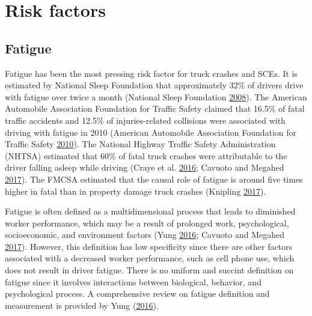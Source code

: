 \documentclass[12pt]{book}
\numberwithin{equation}{chapter}
\begin{document}
\hypertarget{risk-factors}{%
\section{Risk factors}\label{risk-factors}}

\hypertarget{fatigue}{%
\subsection{Fatigue}\label{fatigue}}

Fatigue has been the most pressing risk factor for truck crashes and SCEs. It is estimated by National Sleep Foundation that approximately 32\% of drivers drive with fatigue over twice a month (National Sleep Foundation \protect\hyperlink{ref-nsleepf}{2008}). The American Automobile Association Foundation for Traffic Safety claimed that 16.5\% of fatal traffic accidents and 12.5\% of injuries-related collisions were associated with driving with fatigue in 2010 (American Automobile Association Foundation for Traffic Safety \protect\hyperlink{ref-aaafoundation}{2010}). The National Highway Traffic Safety Administration (NHTSA) estimated that 60\% of fatal truck crashes were attributable to the driver falling asleep while driving (Craye et al. \protect\hyperlink{ref-craye2016multi}{2016}; Cavuoto and Megahed \protect\hyperlink{ref-cavuoto2017understanding}{2017}). The FMCSA estimated that the causal role of fatigue is around five times higher in fatal than in property damage truck crashes (Knipling \protect\hyperlink{ref-knipling2017threats}{2017}).

Fatigue is often defined as a multidimensional process that leads to diminished worker performance, which may be a result of prolonged work, psychological, socioeconomic, and environment factors (Yung \protect\hyperlink{ref-yung2016fatigue}{2016}; Cavuoto and Megahed \protect\hyperlink{ref-cavuoto2017understanding}{2017}). However, this definition has low specificity since there are other factors associated with a decreased worker performance, such as cell phone use, which does not result in driver fatigue. There is no uniform and succint definition on fatigue since it involves interactions between biological, behavior, and psychological process. A comprehensive review on fatigue definition and measurement is provided by Yung (\protect\hyperlink{ref-yung2016fatigue}{2016}).
\end{document}
